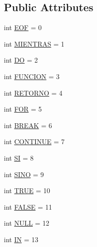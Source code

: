 \subsection*{Public Attributes}
\begin{DoxyCompactItemize}
\item 
int \mbox{\hyperlink{interfaceanalizadores_1_1_gramatica_constants_a78849fabb7f96d877057df7bc842f18e}{E\+OF}} = 0
\item 
int \mbox{\hyperlink{interfaceanalizadores_1_1_gramatica_constants_a2bb08e3061d1cbbbc62bd109fea7d306}{M\+I\+E\+N\+T\+R\+AS}} = 1
\item 
int \mbox{\hyperlink{interfaceanalizadores_1_1_gramatica_constants_a07821a423cc437fe2fd22edd7f4ec5d8}{DO}} = 2
\item 
int \mbox{\hyperlink{interfaceanalizadores_1_1_gramatica_constants_a981f1c14f28166e55b0a31b26b0b0e83}{F\+U\+N\+C\+I\+ON}} = 3
\item 
int \mbox{\hyperlink{interfaceanalizadores_1_1_gramatica_constants_a04405a6ab5d03ee083a65c067cb476a6}{R\+E\+T\+O\+R\+NO}} = 4
\item 
int \mbox{\hyperlink{interfaceanalizadores_1_1_gramatica_constants_aaf66e077637af9181c9d21b11b842ad3}{F\+OR}} = 5
\item 
int \mbox{\hyperlink{interfaceanalizadores_1_1_gramatica_constants_a0074ea97516624677218650e453db212}{B\+R\+E\+AK}} = 6
\item 
int \mbox{\hyperlink{interfaceanalizadores_1_1_gramatica_constants_a33b0c0fcbd620e83d8e8b57163bfcd8c}{C\+O\+N\+T\+I\+N\+UE}} = 7
\item 
int \mbox{\hyperlink{interfaceanalizadores_1_1_gramatica_constants_a989aff00f85aedf3c451be5dfd7d9181}{SI}} = 8
\item 
int \mbox{\hyperlink{interfaceanalizadores_1_1_gramatica_constants_ab6beefe470534d1183471e82195f52d5}{S\+I\+NO}} = 9
\item 
int \mbox{\hyperlink{interfaceanalizadores_1_1_gramatica_constants_a24400027cdf8750bdb27f414806f66f0}{T\+R\+UE}} = 10
\item 
int \mbox{\hyperlink{interfaceanalizadores_1_1_gramatica_constants_ab68bef741cc34a342d22b7918964be5c}{F\+A\+L\+SE}} = 11
\item 
int \mbox{\hyperlink{interfaceanalizadores_1_1_gramatica_constants_a30b827671b3dc645fe5cc79a4b2ed46a}{N\+U\+LL}} = 12
\item 
int \mbox{\hyperlink{interfaceanalizadores_1_1_gramatica_constants_acff59f75d71d957b9930f91d75fd5038}{IN}} = 13
\item 

\end{DoxyCompactItemize}
